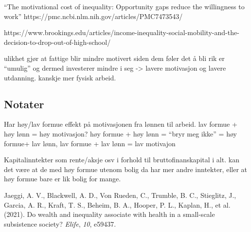 \documentclass[
  11pt,
  a4paper,
  DIV=11,
  numbers=noendperiod]{scrartcl}
\newlength{\cslhangindent}
\newenvironment{CSLReferences}[2] %
 {\begin{list}{}{%
  \setlength{\itemindent}{0pt}
  \setlength{\leftmargin}{0pt}
  \setlength{\parsep}{0pt}
  \ifodd #1
   \setlength{\leftmargin}{\cslhangindent}
   \setlength{\itemindent}{-1\cslhangindent}
  \fi
  \setlength{\itemsep}{#2\baselineskip}}}
 {\end{list}}
\begin{document}
``The motivational cost of inequality: Opportunity gaps reduce the
willingness to work'' https://pmc.ncbi.nlm.nih.gov/articles/PMC7473543/

https://www.brookings.edu/articles/income-inequality-social-mobility-and-the-decision-to-drop-out-of-high-school/

ulikhet gjør at fattige blir mindre motivert siden dem føler det å bli
rik er ``umulig'' og dermed investerer mindre i seg -\textgreater{}
lavere motivasjon og lavere utdanning. kanskje mer fysisk arbeid.

\subsection{Notater}\label{notater-1}

Har høy/lav formue effekt på motivasjonen fra lønnen til arbeid. lav
formue + høy lønn = høy motivasjon? høy formue + høy lønn = ``bryr meg
ikke'' = høy formue+ lav lønn, lav formue + lav lønn = lav motivajon

Kapitalinntekter som rente/aksje osv i forhold til bruttofinanskapital i
alt. kan det være at de med høy formue utenom bolig da har mer andre
inntekter, eller at høy formue bare er lik bolig for mange.

\label{refs}
\begin{CSLReferences}{1}{0}
Jaeggi, A. V., Blackwell, A. D., Von Rueden, C., Trumble, B. C.,
Stieglitz, J., Garcia, A. R., Kraft, T. S., Beheim, B. A., Hooper, P.
L., Kaplan, H., et al. (2021). Do wealth and inequality associate with
health in a small-scale subsistence society? \emph{Elife}, \emph{10},
e59437.

\end{CSLReferences}
\end{document}
